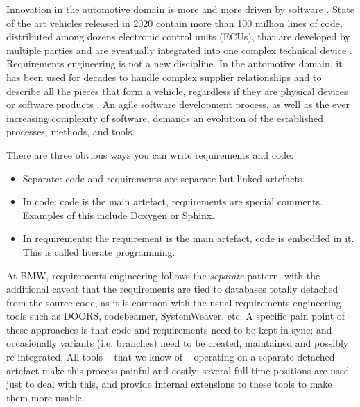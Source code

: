 \documentclass[english]{lni}
\begin{document}
Innovation in the automotive domain is more and more driven by
software \cite{furst2010challenges, broy2006challenges}. State of the
art vehicles released in 2020 contain more than 100 million lines of
code, distributed among dozens electronic control units (ECUs), that
are developed by multiple parties and are eventually integrated into
one complex technical device \cite{Mihailovici2021}.
Requirements engineering is not a new discipline. In the automotive
domain, it has been used for decades to handle complex supplier
relationships and to describe all the pieces that form a vehicle,
regardless if they are physical devices or software products
\cite{allmann2009situations}. An agile software development process,
as well as the ever increasing complexity of software, demands an
evolution of the established processes, methods, and tools.

There are three obvious ways you can write requirements and code:
\begin{itemize}
\item Separate: code and requirements are separate but linked
  artefacts.
\item In code: code is the main artefact, requirements are special
  comments. Examples of this include Doxygen or Sphinx.
\item In requirements: the requirement is the main artefact, code is
  embedded in it. This is called literate
  programming. \cite{knuth1986metafont}
\end{itemize}

At BMW, requirements engineering follows the \emph{separate} pattern,
with the additional caveat that the requirements are tied to databases
totally detached from the source code, as it is common with the usual
requirements engineering tools such as DOORS, codebeamer,
SystemWeaver, etc. A specific pain point of these approaches is that
code and requirements need to be kept in sync; and occasionally
variants (i.e. branches) need to be created, maintained and possibly
re-integrated. All tools -- that we know of -- operating on a separate
detached artefact make this process painful and costly: several
full-time positions are used just to deal with this, and provide
internal extensions to these tools to make them more usable.
\end{document}
